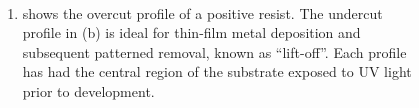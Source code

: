 \documentclass[
  a4paper,
]{scrbook}
\providecommand{\tightlist}{%
  \setlength{\itemsep}{0pt}\setlength{\parskip}{0pt}}\usepackage{longtable,booktabs,array}
\begin{document}
\begin{figure}

\begin{minipage}[t]{0.47\linewidth}

{\centering 


}

\subcaption{\label{fig-overcut-profile}}
\end{minipage}%
%
\begin{minipage}[t]{0.05\linewidth}

{\centering 

~

}

\end{minipage}%
%
\begin{minipage}[t]{0.47\linewidth}

{\centering 


}

\subcaption{\label{fig-undercut-profile}}
\end{minipage}%
\newline
\begin{minipage}[t]{0.47\linewidth}

{\centering 

\begin{enumerate}
\def\labelenumi{(\alph{enumi})}
\tightlist
\item
  shows the overcut profile of a positive resist. The undercut profile
  in (b) is ideal for thin-film metal deposition and subsequent
  patterned removal, known as ``lift-off''. Each profile has had the
  central region of the substrate exposed to UV light prior to
  development.
\end{enumerate}

}
\end{minipage}
\end{figure}
\end{document}
